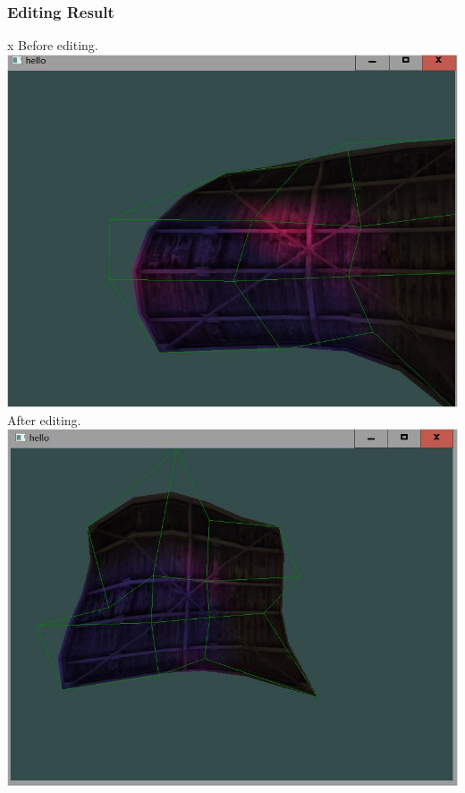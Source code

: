 \documentclass[acmtog]{acmart}
\begin{document}
\subsubsection{Editing Result}x
Before editing.\\
\includegraphics[scale=0.5]{3}\\
After editing.\\
\includegraphics[scale=0.5]{4}
\end{document}
